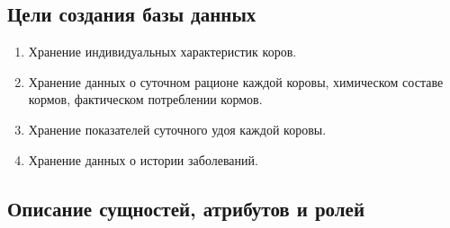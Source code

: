 \subsection{Цели создания базы данных}
\begin{enumerate}
    \item Хранение индивидуальных характеристик коров.
    \item Хранение данных о суточном рационе каждой коровы, химическом составе кормов, фактическом потреблении кормов.
    \item Хранение показателей суточного удоя каждой коровы.
    \item Хранение данных о истории заболеваний.
\end{enumerate}
\newpage
\subsection{Описание сущностей, атрибутов и ролей}

